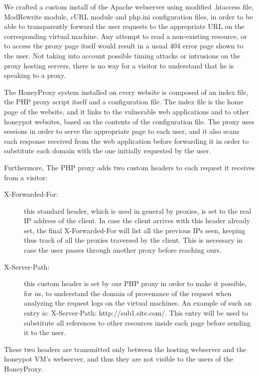 We crafted a custom install of the Apache webserver using modified .htaccess file, ModRewrite module, cURL module and php.ini configuration files, in order to be able to transparently forward the user requests to the appropriate URL on the corresponding virtual machine. Any attempt to read a non-existing resource, or to access the proxy page itself would result in a usual 404 error page shown to the user. Not taking into account possible timing attacks or intrusions on the proxy hosting servers, there is no way for a visitor to understand that he is speaking to a proxy.

The HoneyProxy system installed on every website is composed of an index file, the PHP proxy script itself and a configuration file. The index file is the home page of the website, and it links to the vulnerable web applications and to other honeypot websites, based on the contents of the configuration file. The proxy uses sessions in order to serve the appropriate page to each user, and it also scans each response received from the web application before forwarding it in order to substitute each domain with the one initially requested by the user.

Furthermore, The PHP proxy adds two custom headers to each request it receives from a visitor:

\begin{description}
\item[X-Forwarded-For: ] this standard header, which is used in general by proxies, is set to the real IP address of the client. In case the client arrives with this header already set, the final X-Forwarded-For will list all the previous IPs seen, keeping thus track of all the proxies traversed by the client. This is necessary in case the user passes through another proxy before reaching ours.

\item[X-Server-Path: ] this custom header is set by our PHP proxy in order to make it possible, for us, to understand the domain of provenance of the request when analyzing the request logs on the virtual machines. An example of such an entry is: X-Server-Path: http://sub1.site.com/. This entry will be used to substitute all references to other resources inside each page before sending it to the user.
\end{description}

These two headers are transmitted only between the hosting webserver and the honeypot VM's webserver, and thus they are not visible to the users of the HoneyProxy.

